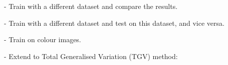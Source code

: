 \documentclass[12pt]{article}
\begin{document}
- Train with a different dataset and compare the results.

- Train with a different dataset and test on this dataset, and vice versa.

- Train on colour images.

- Extend to Total Generalised Variation (TGV) method: \cite{tgv-bredies-2010}












\end{document}
